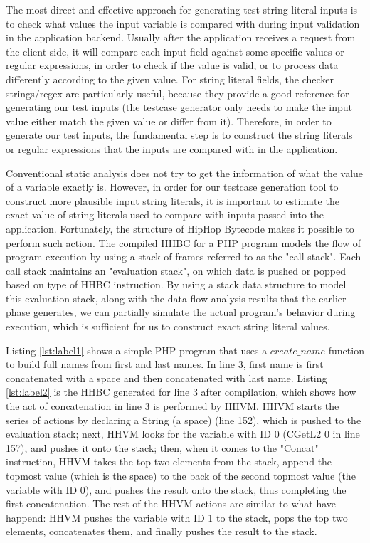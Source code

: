 The most direct and effective approach for generating test string literal inputs is to check what values the input variable is compared with during input validation in the application backend. Usually after the application receives a request from the client side, it will compare each input field against some specific values or regular expressions, in order to check if the value is valid, or to process data differently according to the given value. For string literal fields, the checker strings/regex are particularly useful, because they provide a good reference for generating our test inputs (the testcase generator only needs to make the input value either match the given value or differ from it). Therefore, in order to generate our test inputs, the fundamental step is to construct the string literals or regular expressions that the inputs are compared with in the application.

Conventional static analysis does not try to get the information of what the value of a variable exactly is. However, in order for our testcase generation tool to construct more plausible input string literals, it is important to estimate the exact value of string literals used to compare with inputs passed into the application. Fortunately, the structure of HipHop Bytecode makes it possible to perform such action. The compiled HHBC for a PHP program models the flow of program execution by using a stack of frames referred to as the "call stack". Each call stack maintains an "evaluation stack", on which data is pushed or popped based on type of HHBC instruction. By using a stack data structure to model this evaluation stack, along with the data flow analysis results that the earlier phase generates, we can partially simulate the actual program's behavior during execution, which is sufficient for us to construct exact string literal values.

Listing \ref{lst:label1} shows a simple PHP program that uses a $create\_name$ function to build full names from first and last names. In line 3, first name is first concatenated with a space and then concatenated with last name. Listing \ref{lst:label2} is the HHBC generated for line 3 after compilation, which shows how the act of concatenation in line 3 is performed by HHVM. HHVM starts the series of actions by declaring a String (a space) (line 152), which is pushed to the evaluation stack; next, HHVM looks for the variable with ID 0 (CGetL2 0 in line 157), and pushes it onto the stack; then, when it comes to the "Concat" instruction, HHVM takes the top two elements from the stack, append the topmost value (which is the space) to the back of the second topmost value (the variable with ID 0), and pushes the result onto the stack, thus completing the first concatenation. The rest of the HHVM actions are similar to what have happend: HHVM pushes the variable with ID 1 to the stack, pops the top two elements, concatenates them, and finally pushes the result to the stack.

